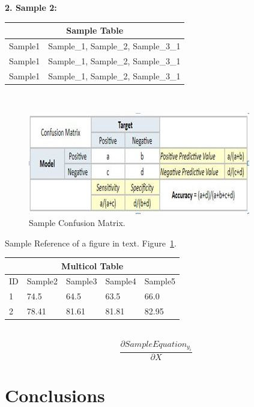 \documentclass[10pt,twocolumn,letterpaper]{article}
\begin{document}
\textbf{2. Sample 2:}\\
\begin{tabular}{ |p{3cm}|p{5cm}|  }
 \hline
 \multicolumn{2}{|c|}{Sample Table} \\
 \hline
 Sample1 &Sample\_1, Sample\_2, Sample\_3\_1\\
 \hline
 Sample1 &Sample\_1, Sample\_2, Sample\_3\_1\\
 \hline
 Sample1 &Sample\_1, Sample\_2, Sample\_3\_1\\
 \hline
\end{tabular}\\

\begin{figure}
   \begin{center}
  \includegraphics[width=\linewidth]{ConfusionMatrix.JPG}
   \end{center}
   \caption{Sample Confusion Matrix.\cite{W1}
   \label{Img1}}
\end{figure} 
Sample Reference of a figure in text. Figure~\ref{Img1}.\\

\begin{tabular}{ |p{0.5cm}||p{1.4cm}|p{1.4cm}|p{1.4cm}|p{1.4cm}|  }
 \hline
 \multicolumn{5}{|c|}{Multicol Table} \\
 \hline
 ID & Sample2 & Sample3 & Sample4 & Sample5\\
 \hline
 1 & 74.5 & 64.5 & 63.5 & 66.0\\
 \hline
 2 & 78.41 & 81.61 & 81.81 & 82.95\\
 \hline
\end{tabular}\\

\begin{equation}
\frac{\partial Sample Equation_{y_i}}{\partial X}
\end{equation}

\section{Conclusions}
\appendix
{\small


}
\end{document}
